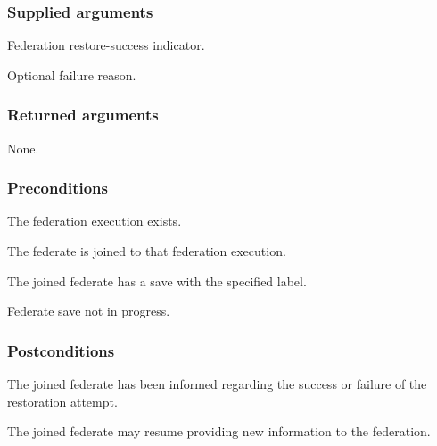 \subsubsection{Supplied arguments}

\begin{stdalphalist}
    \item Federation restore-success indicator.
    \item Optional failure reason.
\end{stdalphalist}

\subsubsection{Returned arguments}

\begin{stdalphalist}
    \item None.
\end{stdalphalist}

\subsubsection{Preconditions}

\begin{stdalphalist}
    \item The federation execution exists.
    \item The federate is joined to that federation execution.
\end{stdalphalist}

\clearpage

\begin{stdalphalist}
    \setcounter{enumi}{2}
    \item The joined federate has a save with the specified label.
    \item Federate save not in progress.
\end{stdalphalist}

\subsubsection{Postconditions}

\begin{stdalphalist}
    \item The joined federate has been informed regarding the success or failure of the restoration attempt.
    \item The joined federate may resume providing new information to the federation.
\end{stdalphalist}


